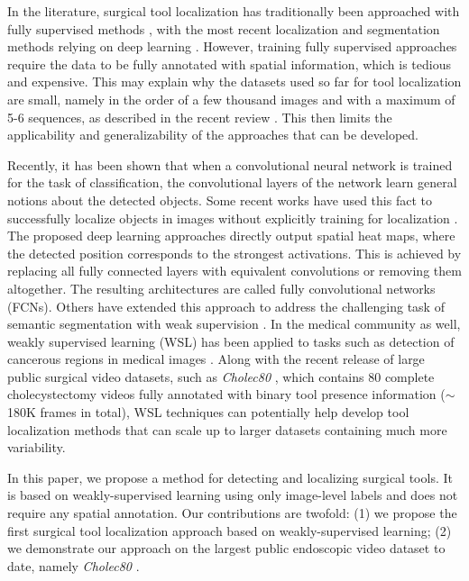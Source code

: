 \documentclass[english,runningheads,a4paper]{llncs}
\begin{document}
In the literature, surgical tool localization has traditionally been approached with fully supervised methods \cite{BOUGET:media17}, with the most recent localization and segmentation methods relying on deep learning \cite{garcia:iros17,jin:wacv17,kurmann:miccai17,laina:miccai17,sahu:ijcars17}. 
However, training fully supervised approaches require the data to be fully annotated with spatial information, which is tedious and expensive. 
This may explain why the datasets used so far for tool localization are small, namely in the order of a few thousand images and with a maximum of 5-6 sequences, as described in the recent review \cite{BOUGET:media17}. This then limits the applicability and generalizability of the approaches that can be developed. 

Recently, it has been shown that when a convolutional neural network is trained for the task of classification, the convolutional layers of the network learn general notions about the detected objects. 
Some recent works have used this fact to successfully localize objects in images without explicitly training for localization \cite{oquab:cvpr15,singh:iccv2017,zhou:corr14}. 
The proposed deep learning approaches directly output spatial heat maps, where the detected position corresponds to the strongest activations. 
This is achieved by replacing all fully connected layers with equivalent convolutions or removing them altogether. 
The resulting architectures are called fully convolutional networks (FCNs). 
Others have extended this approach to address the challenging task of semantic segmentation with weak supervision \cite{durand:cvpr17,kim:iccv17,saleh:pami18}. 
In the medical community as well, weakly supervised learning (WSL) has been applied to tasks such as detection of cancerous regions in medical images \cite{hwang:miccai16,jia:tmi17}. Along with the recent release of large public surgical video datasets, such as \textit{Cholec80} \cite{twinanda:tmi17}, which contains 80 complete cholecystectomy videos fully annotated with binary tool presence information ($\sim$180K frames in total), WSL techniques can potentially help develop tool localization methods that can scale up to larger datasets containing much more variability. 

In this paper, we propose a method for detecting and localizing surgical tools. It is based on weakly-supervised learning using only image-level labels and does not require any spatial annotation. Our contributions are twofold: (1) we propose the first surgical tool localization approach based on weakly-supervised learning; (2) we demonstrate our approach on the largest public endoscopic video dataset to date, namely \textit{Cholec80} \cite{twinanda:tmi17}.
\end{document}

